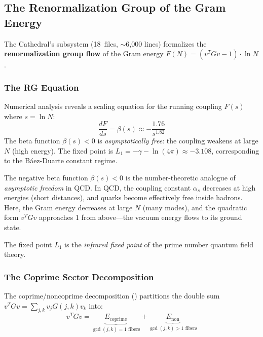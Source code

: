 \subsection{The Renormalization Group of the Gram Energy}
\label{sec:rg-flow}

The Cathedral's  subsystem (18~files,
$\sim$6{,}000 lines) formalizes the \textbf{renormalization group flow}
of the Gram energy $F(N) = (v^T G v - 1) \cdot \ln N$.

\subsubsection{The RG Equation}

Numerical analysis reveals a scaling equation for the running coupling
$F(s)$ where $s = \ln N$:
\[
  \frac{dF}{ds} = \beta(s) \approx -\frac{1.76}{s^{1.82}}
\]
The beta function $\beta(s) < 0$ is {\em asymptotically free}:
the coupling weakens at large $N$ (high energy). The fixed point
is $L_1 = -\gamma - \ln(4\pi) \approx -3.108$, corresponding to
the B\'aez-Duarte constant regime.

\begin{correspondence}
\label{corr:rg-flow}
The negative beta function $\beta(s) < 0$ is the number-theoretic
analogue of \emph{asymptotic freedom} in QCD. In QCD, the coupling
constant $\alpha_s$ decreases at high energies (short distances),
and quarks become effectively free inside hadrons. Here, the Gram
energy decreases at large $N$ (many modes), and the quadratic form
$v^T G v$ approaches 1 from above---the vacuum energy flows to its
ground state.

The fixed point $L_1$ is the \emph{infrared fixed point} of the
prime number quantum field theory.
\end{correspondence}

\subsubsection{The Coprime Sector Decomposition}

The coprime/noncoprime decomposition () partitions
the double sum $v^T G v = \sum_{j,k} v_j G(j,k) v_k$ into:
\[
  v^T G v = \underbrace{E_{\mathrm{coprime}}}_{
    \gcd(j,k) = 1\text{ fibers}} +
  \underbrace{E_{\mathrm{non}}}_{
    \gcd(j,k) > 1\text{ fibers}}
\]

